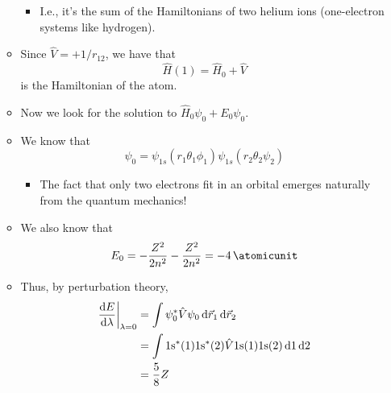 \documentclass[../notes.tex]{subfiles}
\begin{document}
\begin{itemize}
\begin{itemize}
        \begin{itemize}
            \item I.e., it's the sum of the Hamiltonians of two helium ions (one-electron systems like hydrogen).
        \end{itemize}
        \item Since $\hat{V}=+1/r_{12}$, we have that
        \begin{equation*}
            \hat{H}(1) = \hat{H}_0+\hat{V}
        \end{equation*}
        is the Hamiltonian of the atom.
        \item Now we look for the solution to $\hat{H}_0\psi_0+E_0\psi_0$.
        \item We know that
        \begin{equation*}
            \psi_0 = \psi_{1s}(r_1\theta_1\phi_1)\psi_{1s}(r_2\theta_2\psi_2)
        \end{equation*}
        \begin{itemize}
            \item The fact that only two electrons fit in an orbital emerges naturally from the quantum mechanics!
        \end{itemize}
        \item We also know that
        \begin{equation*}
            E_0 = -\frac{Z^2}{2n^2}-\frac{Z^2}{2n^2} = -\SI{4}{\atomicunit}
        \end{equation*}
        \item Thus, by perturbation theory,
        \begin{align*}
            \dv{E}{\lambda}\bigg|_{\lambda=0} &= \int\psi_0^*\hat{V}\psi_0\dd{\vec{r}_1}\dd{\vec{r}_2}\\
            &= \int\text{1s}^*(1)\text{1s}^*(2)\hat{V}\text{1s}(1)\text{1s}(2)\dd{1}\dd{2}\\
            &= \frac{5}{8}Z
        \end{align*}
    \end{itemize}
\end{itemize}
\end{document}
